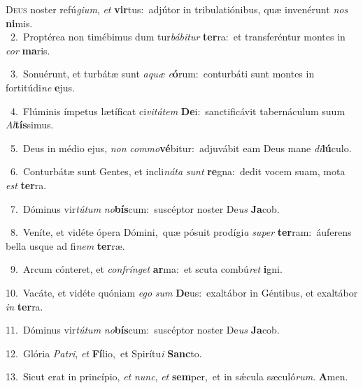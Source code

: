 \lettrine{\initial\textcolor{\initialcolor}{D}}{eus} noster refú\-\textit{gi}\-\textit{um}, \textit{et} \textbf{vir}\-tus:~\star adjútor in tribulatiónibus, quæ invenérunt \textit{nos} \textbf{ni}\-mis.\\
{\numbfont\textcolor{\numbcolor}{~2.}}~Proptérea non timébimus dum tur\-\textit{bá}\-\textit{bi}\textit{tur} \textbf{ter}\-ra:~\star et transferéntur montes in \textit{cor} \textbf{ma}\-ris.\par
{\numbfont\textcolor{\numbcolor}{~3.}}~Sonuérunt, et turbátæ sunt \textit{a}\-\textit{quæ} \textit{e}\-\textbf{ó}rum:~\star conturbáti sunt montes in fortitúdi\textit{ne} \textbf{e}\-jus.\par
{\numbfont\textcolor{\numbcolor}{~4.}}~Flúminis ímpetus lætíficat ci\-\textit{vi}\-\textit{tá}\textit{tem} \textbf{De}\-i:~\star sanctificávit tabernáculum suum \textit{Al}\-\textbf{tís}simus.\par
{\numbfont\textcolor{\numbcolor}{~5.}}~Deus in médio ejus, \textit{non} \textit{com}\-\textit{mo}\textbf{vé}bitur:~\star adjuvábit eam Deus mane \textit{di}\-\textbf{lú}culo.\par
{\numbfont\textcolor{\numbcolor}{~6.}}~Conturbátæ sunt Gentes, et incli\-\textit{ná}\-\textit{ta} \textit{sunt} \textbf{re}\-gna:~\star dedit vocem suam, mota \textit{est} \textbf{ter}\-ra.\par
{\numbfont\textcolor{\numbcolor}{~7.}}~Dóminus vir\-\textit{tú}\-\textit{tum} \textit{no}\-\textbf{bís}cum:~\star suscéptor noster De\textit{us} \textbf{Ja}\-cob.\par
{\numbfont\textcolor{\numbcolor}{~8.}}~Veníte, et vidéte ópera Dómini,~\dagger quæ pósuit prodígi\textit{a} \textit{su}\-\textit{per} \textbf{ter}\-ram:~\star áuferens bella usque ad fi\textit{nem} \textbf{ter}\-ræ.\par
{\numbfont\textcolor{\numbcolor}{~9.}}~Arcum cónteret, et \textit{con}\-\textit{frín}\textit{get} \textbf{ar}\-ma:~\star et scuta combú\textit{ret} \textbf{i}\-gni.\par
{\numbfont\textcolor{\numbcolor}{10.}}~Vacáte, et vidéte quóniam \textit{e}\-\textit{go} \textit{sum} \textbf{De}\-us:~\star exaltábor in Géntibus, et exaltábor \textit{in} \textbf{ter}\-ra.\par
{\numbfont\textcolor{\numbcolor}{11.}}~Dóminus vir\-\textit{tú}\-\textit{tum} \textit{no}\-\textbf{bís}cum:~\star suscéptor noster De\textit{us} \textbf{Ja}\-cob.\par
{\numbfont\textcolor{\numbcolor}{12.}}~Glória \textit{Pa}\-\textit{tri}, \textit{et} \textbf{Fí}\-lio,~\star et Spirítu\textit{i} \textbf{Sanc}\-to.\par
{\numbfont\textcolor{\numbcolor}{13.}}~Sicut erat in princípio, \textit{et} \textit{nunc}\-, \textit{et} \textbf{sem}\-per,~\star et in sǽcula sæculó\-\textit{rum}\-. \textbf{A}\-men.\par
